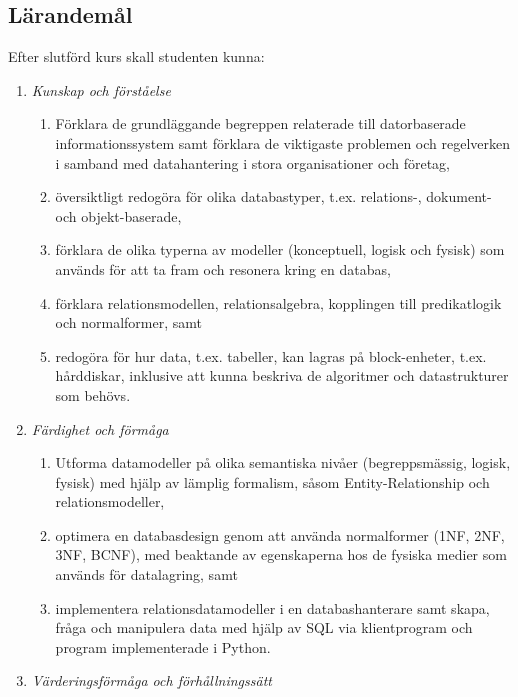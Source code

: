 \subsection*{Lärandemål}

Efter slutförd kurs skall studenten kunna:

\begin{enumerate}
\def\labelenumi{\Alph{enumi}.}
\tightlist
\item
  \emph{Kunskap och förståelse}

  \begin{enumerate}
  \def\labelenumii{\Alph{enumi}.\arabic{enumii}.}
  \tightlist
  \item
    Förklara de grundläggande begreppen relaterade till datorbaserade
    informationssystem samt förklara de viktigaste problemen och
    regelverken i samband med datahantering i stora organisationer och
    företag,
  \item
    översiktligt redogöra för olika databastyper, t.ex. relations-,
    dokument- och objekt-baserade,
  \item
    förklara de olika typerna av modeller (konceptuell, logisk och
    fysisk) som används för att ta fram och resonera kring en databas,
  \item
    förklara relationsmodellen, relationsalgebra, kopplingen till
    predikatlogik och normalformer, samt
  \item
    redogöra för hur data, t.ex. tabeller, kan lagras på block-enheter,
    t.ex. hårddiskar, inklusive att kunna beskriva de algoritmer och
    datastrukturer som behövs.
  \end{enumerate}
\item
  \emph{Färdighet och förmåga}

  \begin{enumerate}
  \def\labelenumii{\Alph{enumi}.\arabic{enumii}.}
  \tightlist
  \item
    Utforma datamodeller på olika semantiska nivåer (begreppsmässig,
    logisk, fysisk) med hjälp av lämplig formalism, såsom
    Entity-Relationship och relationsmodeller,
  \item
    optimera en databasdesign genom att använda normalformer (1NF, 2NF,
    3NF, BCNF), med beaktande av egenskaperna hos de fysiska medier som
    används för datalagring, samt
  \item
    implementera relationsdatamodeller i en databashanterare samt skapa,
    fråga och manipulera data med hjälp av SQL via klientprogram och
    program implementerade i Python.
  \end{enumerate}
\item
  \emph{Värderingsförmåga och förhållningssätt}


\end{enumerate}
